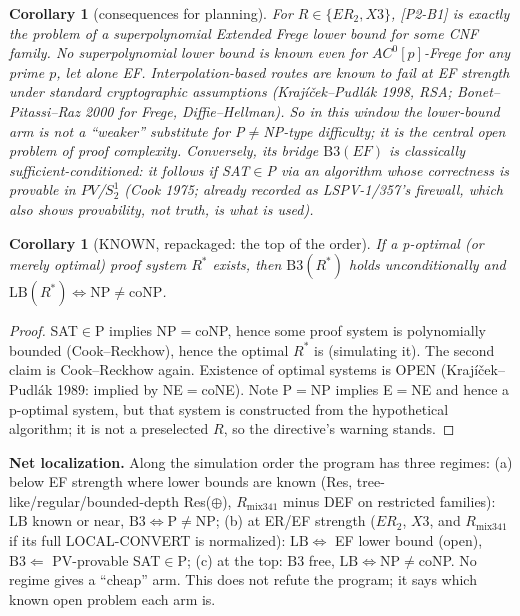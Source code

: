 \documentclass[11pt]{article}
\newtheorem{corollary}[theorem]{Corollary}
\theoremstyle{definition}
\begin{document}
\begin{corollary}[consequences for planning]\label{cor:x3}
For $R\in\{ER_2,X3\}$, [P2-B1] is \emph{exactly} the problem of a superpolynomial Extended Frege lower bound for
some CNF family. No superpolynomial lower bound is known even for $AC^0[p]$-Frege for any prime $p$, let alone
EF. Interpolation-based routes are known to fail at EF strength under standard cryptographic assumptions
(Krajíček--Pudlák 1998, RSA; Bonet--Pitassi--Raz 2000 for Frege, Diffie--Hellman). So in this window the
lower-bound arm is not a ``weaker'' substitute for P$\ne$NP-type difficulty; it is the central open problem of
proof complexity. Conversely, its bridge $\mathrm{B3}(EF)$ is classically sufficient-conditioned: it follows
if SAT$\in$P via an algorithm whose correctness is provable in $PV$/$S^1_2$ (Cook 1975; already recorded as
LSPV-1/357's firewall, which also shows provability, not truth, is what is used).
\end{corollary}

\begin{corollary}[KNOWN, repackaged: the top of the order]\label{cor:popt}
If a p-optimal (or merely optimal) proof system $R^\ast$ exists, then $\mathrm{B3}(R^\ast)$ holds
unconditionally and $\mathrm{LB}(R^\ast)\iff\mathrm{NP}\ne\mathrm{coNP}$.
\end{corollary}
\begin{proof}
SAT$\in$P implies NP$=$coNP, hence some proof system is polynomially bounded (Cook--Reckhow), hence
the optimal $R^\ast$ is (simulating it). The second claim is Cook--Reckhow again. Existence of optimal systems is
OPEN (Krajíček--Pudlák 1989: implied by NE$=$coNE). Note P$=$NP implies E$=$NE and hence a p-optimal system,
but that system is constructed from the hypothetical algorithm; it is not a preselected $R$, so the
directive's warning stands.
\end{proof}

\noindent\textbf{Net localization.} Along the simulation order the program has three regimes:
(a) below EF strength where lower bounds are known (Res, tree-like/regular/bounded-depth Res($\oplus$),
$R_{\mathrm{mix341}}$ minus DEF on restricted families): $\mathrm{LB}$ known or near, $\mathrm{B3}\iff$P$\ne$NP;
(b) at ER/EF strength ($ER_2$, $X3$, and $R_{\mathrm{mix341}}$ if its full LOCAL-CONVERT is normalized):
$\mathrm{LB}\iff$ EF lower bound (open), $\mathrm{B3}\Leftarrow$ PV-provable SAT$\in$P;
(c) at the top: $\mathrm{B3}$ free, $\mathrm{LB}\iff$NP$\ne$coNP. No regime gives a ``cheap'' arm.
This does not refute the program; it says which known open problem each arm is.
\end{document}
